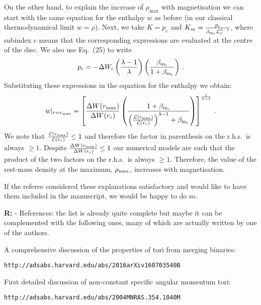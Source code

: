 \documentclass{article}
\begin{document}
\bigskip

On the other hand, to explain the increase of $\rho_{\mathrm{max}}$ with magnetisation we can start with the same equation for the enthalpy $w$ as before (in our classical thermodynamical limit $w=\rho$). Next, we take $K=p_c$ and $K_m=\frac{p_c}{\beta_{{\rm m}_{\rm c}} \mathcal{L}_{c}^{\lambda-1}}$, where subindex $c$ means that the corresponding expressions are evaluated at the centre of the disc. We also use Eq.~(25) to write
\begin{eqnarray*}
p_c=-\Delta W_c \left( \frac{\lambda-1}{\lambda} \right) \left(  \frac{\beta_{{\rm m}_{\rm c}}}{1+\beta_{{\rm m}_{\rm c}}} \right)\,.
\end{eqnarray*}
Substituting these expressions in the equation for the enthalpy we obtain:
\begin{eqnarray*}
w|_{r=r_{\rm max}}= \left[
\frac{\Delta W(r_{\rm max})}{\Delta W(r_{\rm c})}\left(
\frac{1+\beta_{{\rm m}_{\rm c}}}{\left( \frac{\mathcal{L}(r_{\rm max})}{\mathcal{L}(r_c)}   \right)^{\lambda-1}+\beta_{{\rm m}_{\rm c}}}
\right)
\right]^{\frac{1}{\lambda-1}}\,.
\end{eqnarray*}
We note that $\frac{\mathcal{L}(r_{\rm max})}{\mathcal{L}(r_c)}\le 1$ and therefore the factor in parenthesis on the r.h.s.~is always $\ge 1$. Despite $\frac{\Delta W(r_{\rm max})}{\Delta W(r_{\rm c})}\le 1$ our numerical models are such that the product of the two factors on the r.h.s.~is always $\ge 1$. Therefore, the value of the rest-mass density at the maximum, $\rho_{\rm max}$, increases with magnetisation.

\bigskip
If the referee considered these explanations satisfactory and would like to have them included in the manuscript, we would be happy to do so.

\bigskip

{\bf R:} - References: the list is already quite complete but maybe it can be
complemented with the following ones, many of which are actually
written by one of the authors.

\bigskip

A comprehensive discussion of the properties of tori from merging binaries:

{\tt http://adsabs.harvard.edu/abs/2016arXiv160703540B}

\bigskip

First detailed discussion of non-constant specific angular momentum tori:

{\tt http://adsabs.harvard.edu/abs/2004MNRAS.354.1040M}
\end{document}
